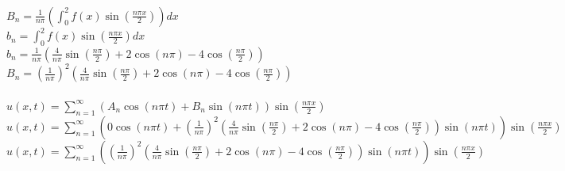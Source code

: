 \documentclass{article}
\begin{document}
\begin{enumerate}
\\$B_n=\frac{1}{n\pi}(\int_0^2f(x)\sin(\frac{n\pi x}{2}))dx$
\\$b_n=\int_0^2f(x)\sin(\frac{n\pi x}{2})dx$
\\$b_n=\frac{1}{n\pi}(\frac{4}{n\pi}\sin(\frac{n\pi}{2})+2\cos(n\pi)-4\cos(\frac{n\pi}{2}))$
\\$B_n=(\frac{1}{n\pi})^2(\frac{4}{n\pi}\sin(\frac{n\pi}{2})+2\cos(n\pi)-4\cos(\frac{n\pi}{2}))$
\\
\\$u(x,t)=\sum_{n=1}^{\infty}(A_n\cos(n\pi t)+B_n\sin(n\pi t))\sin(\frac{n\pi x}{2})$
\\$u(x,t)=\sum_{n=1}^{\infty}(0\cos(n\pi t)+(\frac{1}{n\pi})^2(\frac{4}{n\pi}\sin(\frac{n\pi}{2})+2\cos(n\pi)-4\cos(\frac{n\pi}{2}))\sin(n\pi t))\sin(\frac{n\pi x}{2})$
\\$u(x,t)=\sum_{n=1}^{\infty}((\frac{1}{n\pi})^2(\frac{4}{n\pi}\sin(\frac{n\pi}{2})+2\cos(n\pi)-4\cos(\frac{n\pi}{2}))\sin(n\pi t))\sin(\frac{n\pi x}{2})$



\end{enumerate}
\end{document}
